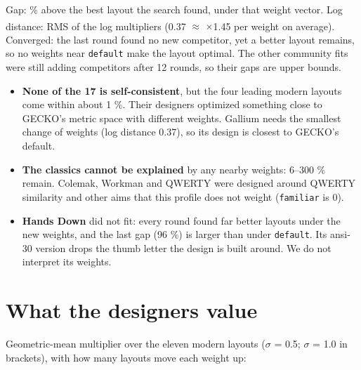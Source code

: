 \documentclass{gecko-paper}
\begin{document}
{Gap: \% above the best layout the search found, under that weight vector. Log distance: RMS of the log multipliers (0.37 $\approx$ $\times$1.45 per weight on average). \textsuperscript{\dag}Converged: the last round found no new competitor, yet a better layout remains, so no weights near \texttt{default} make the layout optimal. The other community fits were still adding competitors after 12 rounds, so their gaps are upper bounds.

\begin{itemize}
\setlength{\itemsep}{1pt}\setlength{\parskip}{0pt}
\item
  \textbf{None of the 17 is self-consistent}, but the four leading modern layouts come within about 1 \%. Their designers optimized something close to GECKO's metric space with different weights. Gallium needs the smallest change of weights (log distance 0.37), so its design is closest to GECKO's default.
\item
  \textbf{The classics cannot be explained} by any nearby weights: 6–300 \% remain. Colemak, Workman and QWERTY were designed around QWERTY similarity and other aims that this profile does not weight (\texttt{familiar} is 0).
\item
  \textbf{Hands Down} did not fit: every round found far better layouts under the new weights, and the last gap (96 \%) is larger than under \texttt{default}. Its ansi-30 version drops the thumb letter the design is built around. We do not interpret its weights.
\end{itemize}

\section{What the designers value}

Geometric-mean multiplier over the eleven modern layouts ($\sigma$ = 0.5; $\sigma$ = 1.0 in brackets), with how many layouts move each weight up:

}
\end{document}

